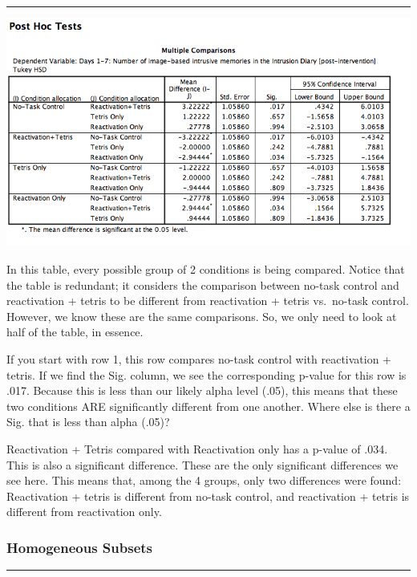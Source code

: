 \documentclass[
]{book}
\begin{document}
\begin{center}\rule{0.5\linewidth}{0.5pt}\end{center}

\includegraphics{img/8.4.21.png}

In this table, every possible group of 2 conditions is being compared. Notice that the table is redundant; it considers the comparison between no-task control and reactivation + tetris to be different from reactivation + tetris vs.~no-task control. However, we know these are the same comparisons. So, we only need to look at half of the table, in essence.

If you start with row 1, this row compares no-task control with reactivation + tetris. If we find the Sig. column, we see the corresponding p-value for this row is .017. Because this is less than our likely alpha level (.05), this means that these two conditions ARE significantly different from one another. Where else is there a Sig. that is less than alpha (.05)?

Reactivation + Tetris compared with Reactivation only has a p-value of .034. This is also a significant difference. These are the only significant differences we see here. This means that, among the 4 groups, only two differences were found: Reactivation + tetris is different from no-task control, and reactivation + tetris is different from reactivation only.

\hypertarget{homogeneous-subsets}{%
\subsubsection{Homogeneous Subsets}\label{homogeneous-subsets}}

\begin{center}\rule{0.5\linewidth}{0.5pt}\end{center}
\end{document}
